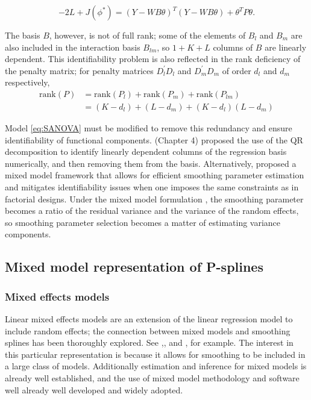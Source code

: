 \documentclass[12pt]{article}
\newcommand{\ms}{\scriptscriptstyle}
\theoremstyle{definition}
\begin{document}
\begin{equation} \label{eq:PSANOVA-objective-function}
-2L + J\left(\phi^*\right) = \left( Y - WB\theta \right)^T\left( Y - WB\theta \right) +  \theta^T P \theta.
\end{equation}


The basis $B$, however, is not of full rank; some of the elements of $B_l$ and $B_m$ are also included in the interaction basis $B_{lm}$, so $1 + K+ L$ columns of $B$ are linearly dependent. This identifiability problem is also reflected in the rank deficiency of the penalty matrix; for penalty matrices $D_l^\prime D_l$ and $D_m^\prime D_m$ of order $d_{\ms l}$ and $d_{\ms m}$ respectively, 
\begin{align*}
\mbox{rank}\left(P\right) &=  \mbox{rank}\left(P_l\right) + \mbox{rank}\left(P_m\right) + \mbox{rank}\left(P_{lm}\right) \\
&= \left(K - d_{\ms l}\right) + \left( L - d_{\ms m}\right) +  \left(K - d_{\ms l}\right)\left( L - d_{\ms m}\right)
\end{align*}

Model \ref{eq:SANOVA} must be modified to remove this redundancy and ensure identifiability of functional components. \citet{wood2017generalized} (Chapter 4) proposed the use of the QR decomposition to identify linearly dependent columns of the regression basis numerically, and then removing them from the basis. Alternatively, \citet{lee2011p} proposed a mixed model framework that allows for efficient smoothing parameter estimation and mitigates identifiability issues when one imposes the same constraints as in factorial designs. Under the mixed model formulation , the smoothing parameter becomes a ratio of the residual variance and the variance of the random effects, so smoothing parameter selection becomes a matter of estimating  variance components. 

\subsection{Mixed model representation of  P-splines}

\subsubsection {Mixed effects models}

Linear mixed effects models are an extension of the linear regression model to include random effects; the connection between mixed models and smoothing splines has been thoroughly explored. See \citet{},\citet{}, and \citet{}, for example. The interest in this particular representation is because it allows for smoothing to be included in a large class of models. Additionally estimation and inference for mixed models is already well established, and the use of mixed model methodology and software well already well developed and widely adopted.
\end{document}
